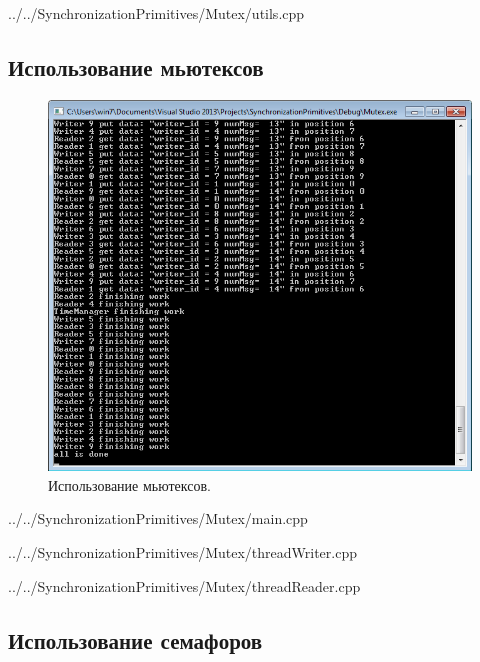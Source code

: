 \documentclass[a4paper, 12pt]{article}		%
\begin{document}

{../../SynchronizationPrimitives/Mutex/utils.cpp}

\newpage
\subsection{Использование мьютексов}

\begin{figure}[h!]
\centering
\includegraphics[scale=1]{res/001}
\caption{Использование мьютексов.}
\end{figure}


{../../SynchronizationPrimitives/Mutex/main.cpp}


{../../SynchronizationPrimitives/Mutex/threadWriter.cpp}


{../../SynchronizationPrimitives/Mutex/threadReader.cpp}


\newpage
\subsection{Использование семафоров}
\end{document}
